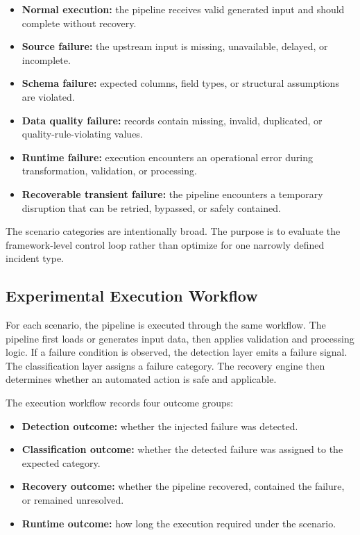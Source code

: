 \begin{itemize}
    \item \textbf{Normal execution:} the pipeline receives valid generated input and should complete without recovery.
    \item \textbf{Source failure:} the upstream input is missing, unavailable, delayed, or incomplete.
    \item \textbf{Schema failure:} expected columns, field types, or structural assumptions are violated.
    \item \textbf{Data quality failure:} records contain missing, invalid, duplicated, or quality-rule-violating values.
    \item \textbf{Runtime failure:} execution encounters an operational error during transformation, validation, or processing.
    \item \textbf{Recoverable transient failure:} the pipeline encounters a temporary disruption that can be retried, bypassed, or safely contained.
\end{itemize}

The scenario categories are intentionally broad. The purpose is to evaluate the framework-level control loop rather than optimize for one narrowly defined incident type.

\subsection{Experimental Execution Workflow}

For each scenario, the pipeline is executed through the same workflow. The pipeline first loads or generates input data, then applies validation and processing logic. If a failure condition is observed, the detection layer emits a failure signal. The classification layer assigns a failure category. The recovery engine then determines whether an automated action is safe and applicable.

The execution workflow records four outcome groups:

\begin{itemize}
    \item \textbf{Detection outcome:} whether the injected failure was detected.
    \item \textbf{Classification outcome:} whether the detected failure was assigned to the expected category.
    \item \textbf{Recovery outcome:} whether the pipeline recovered, contained the failure, or remained unresolved.
    \item \textbf{Runtime outcome:} how long the execution required under the scenario.
\end{itemize}

